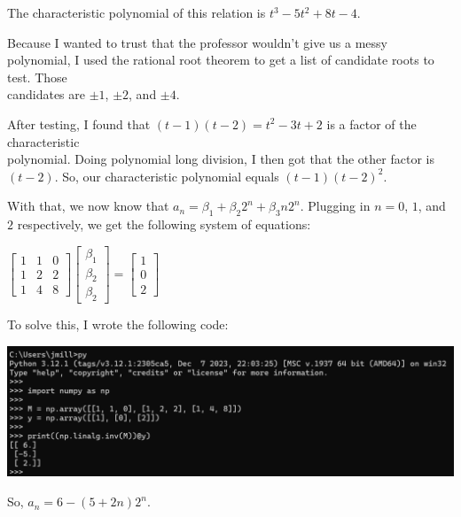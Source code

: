 \documentclass{book}
\newcommand{\exOne}{%
   \color{Purple}%
   \fontsize{13}{15}\selectfont%
}
\newenvironment{myIndent}{%
   \begin{adjustwidth}{2.5em}{0em}%
}{%
   \end{adjustwidth}%
}
\newcommand{\retTwo}{\hfill\bigbreak}
\begin{document}
\begin{myIndent}\exOne
   The characteristic polynomial of this relation is $t^3 - 5t^2 + 8t - 4$.\retTwo

   Because I wanted to trust that the professor wouldn't give us a messy polynomial, I used the rational root theorem to get a list of candidate roots to test. Those\\ candidates are $\pm 1$, $\pm 2$, and $\pm 4$.\retTwo

   After testing, I found that $(t - 1)(t - 2) = t^2 - 3t + 2$ is a factor of the characteristic\\ polynomial. Doing polynomial long division, I then got that the other factor is\\ $(t - 2)$. So, our characteristic polynomial equals $(t - 1)(t - 2)^2$.\retTwo

   With that, we now know that $a_n = \beta_1 + \beta_2 2^n + \beta_3 n 2^n$. Plugging in $n = 0$, $1$, and $2$ respectively, we get the following system of equations:
   
   {\center $
   \begin{bmatrix}
      1 & 1 & 0 \\ 1 & 2 & 2 \\ 1 & 4 & 8
   \end{bmatrix}
   \begin{bmatrix}
      \beta_1 \\ \beta_2 \\ \beta_2
   \end{bmatrix} = 
   \begin{bmatrix}
      1 \\ 0 \\ 2
   \end{bmatrix}$ \retTwo\par}

   To solve this, I wrote the following code:

   {\centering\includegraphics[scale=0.6]{188-HW1_Q1.png}\retTwo\par}

   So, $a_n = 6 - (5 + 2n)2^n$.\retTwo
\end{myIndent}
\end{document}
